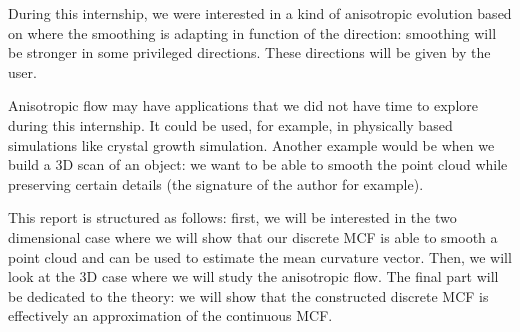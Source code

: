 During this internship, we were interested in a kind of anisotropic evolution
based on \cite{chambolle2012nonlocal} where the smoothing is adapting in
function of the direction: smoothing will be stronger in some privileged
directions. These directions will be given by the user.

Anisotropic flow may have applications that we did not have time to explore
during this internship. It could be used, for example, in physically based
simulations like crystal growth simulation. Another example would be when we
build a 3D scan of an object: we want to be able to smooth the point cloud while
preserving certain details (the signature of the author for example).

This report is structured as follows: first, we will be interested in the two
dimensional case where we will show that our discrete MCF is able to smooth a
point cloud and can be used to estimate the mean curvature vector. Then, we will
look at the 3D case where we will study the anisotropic flow. The final part
will be dedicated to the theory: we will show that the constructed discrete MCF
is effectively an approximation of the continuous MCF.


